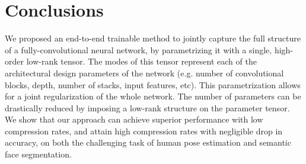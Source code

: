 \documentclass[10pt,twocolumn,letterpaper]{article}
\begin{document}
 \section{Conclusions}
We proposed an end-to-end trainable method to jointly capture the full structure of a fully-convolutional neural network, by parametrizing it with a single, high-order low-rank tensor. The modes of this tensor represent each of the architectural design parameters of the network (e.g. number of convolutional blocks, depth, number of stacks, input features, etc). This parametrization allows for a joint regularization of the whole network. The number of parameters can be drastically reduced by imposing a low-rank structure on the parameter tensor. We show that our approach can achieve superior performance with low compression rates, and attain high compression rates with negligible drop in accuracy, on both the challenging task of human pose estimation and semantic face segmentation. 
\end{document}
